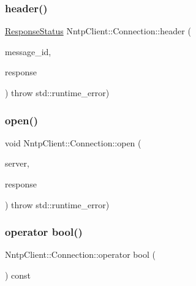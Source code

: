 \hypertarget{class_nntp_client_1_1_connection_ad9a97c7814f2a0584cb45447a2ca5472}{}\label{class_nntp_client_1_1_connection_ad9a97c7814f2a0584cb45447a2ca5472} 
\subsubsection{\texorpdfstring{header()}{header()}}
{\footnotesize\ttfamily \hyperlink{namespace_nntp_client_a920c73a4038b2a2c307245b909b43203}{Response\+Status} Nntp\+Client\+::\+Connection\+::header (\begin{DoxyParamCaption}\item[{const char $\ast$}]{message\+\_\+id,  }\item[{\hyperlink{class_nntp_client_1_1_response}{Response} \&}]{response }\end{DoxyParamCaption}) throw  std\+::runtime\+\_\+error) }

\hypertarget{class_nntp_client_1_1_connection_ad41b4cb74ddbeacf838b0e0b20d692e5}{}\label{class_nntp_client_1_1_connection_ad41b4cb74ddbeacf838b0e0b20d692e5} 
\subsubsection{\texorpdfstring{open()}{open()}}
{\footnotesize\ttfamily void Nntp\+Client\+::\+Connection\+::open (\begin{DoxyParamCaption}\item[{const \hyperlink{class_nntp_client_1_1_server_addr}{Server\+Addr} \&}]{server,  }\item[{\hyperlink{class_nntp_client_1_1_response}{Response} \&}]{response }\end{DoxyParamCaption}) throw  std\+::runtime\+\_\+error) \hspace{0.3cm}{\ttfamily [virtual]}}

\hypertarget{class_nntp_client_1_1_connection_aae3445a5eb5c440a425d1e342fd4f0d8}{}\label{class_nntp_client_1_1_connection_aae3445a5eb5c440a425d1e342fd4f0d8} 
\subsubsection{\texorpdfstring{operator bool()}{operator bool()}}
{\footnotesize\ttfamily Nntp\+Client\+::\+Connection\+::operator bool (\begin{DoxyParamCaption}{ }\end{DoxyParamCaption}) const\hspace{0.3cm}{\ttfamily [inline]}}


